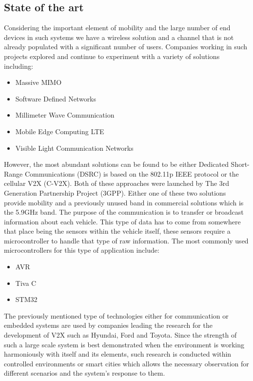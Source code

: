 \subsection{State of the art}
Considering the important element of mobility and the large number of end devices in such systems we have a wireless solution and a channel that is not already populated with a significant number of users. Companies working in such projects explored and continue to experiment with a variety of solutions including:
\begin{itemize}
    \item Massive MIMO
    \item Software Defined Networks
    \item Millimeter Wave Communication
    \item Mobile Edge Computing LTE
    \item Visible Light Communication Networks
\end{itemize}
However, the most abundant solutions can be found to be either Dedicated Short-Range Communications (DSRC) is based on the 802.11p IEEE protocol or the cellular V2X (C-V2X). Both of these approaches were launched by The 3rd Generation Partnership Project (3GPP). Either one of these two solutions provide mobility and a previously unused band in commercial solutions which is the 5.9GHz band.\newline
\hspace{10mm} The purpose of the communication is to transfer or broadcast information about each vehicle. This type of data has to come from somewhere that place being the sensors within the vehicle itself, these sensors require a microcontroller to handle that type of raw information. \newline
The most commonly used microcontrollers for this type of application include:
\begin{itemize}
    \item AVR
    \item Tiva C
    \item STM32 
\end{itemize}
\hspace{10mm} The previously mentioned type of technologies either for communication or embedded systems are used by companies leading the research for the development of V2X such as Hyundai, Ford and Toyota.\newline
Since the strength of such a large scale system is best demonstrated when the environment is working harmoniously with itself and its elements, such research is conducted within controlled environments or smart cities which allows the necessary observation for different scenarios and the system’s response to them. \clearpage
